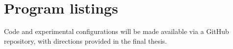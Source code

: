 \documentclass[12pt,openany,a4paper]{book}
\begin{document}
\cleardoublepage




\appendix

\newpage
{}
\mbox{}
\newpage

\chapter{Program listings}
Code and experimental configurations will be made available via a GitHub repository, with directions provided in the final thesis.
\end{document}
